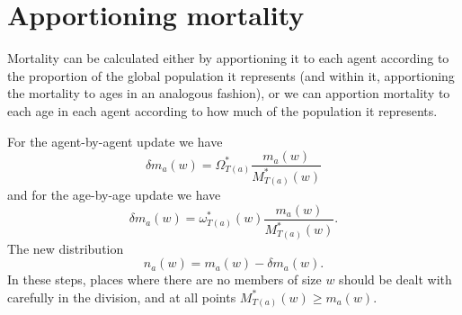 \documentclass{article}
\begin{document}
\section{Apportioning mortality}

Mortality can be calculated either by apportioning it to each agent according
to the proportion of the global population it represents (and within it,
apportioning the mortality to ages in an analogous fashion), or we can
apportion mortality to each age in each agent according to how much of the
population it represents.

For the agent-by-agent update we have
\[ \delta m_a (w) = \Omega^{\ast}_{T (a)}  \frac{m_a (w)}{M^{\ast}_{T (a)}
   (w)} \]
and for the age-by-age update we have
\[ \delta m_a (w) = \omega^{\ast}_{T (a)} (w)  \frac{m_a (w)}{M^{\ast}_{T (a)}
   (w)} . \]
The new distribution
\[ n_a (w) = m_a (w) - \delta m_a (w) . \]
In these steps, places where there are no members of size $w$ should be dealt
with carefully in the division, and at all points $M^{\ast}_{T (a)} (w)
\geqslant m_a (w)$.
\end{document}
